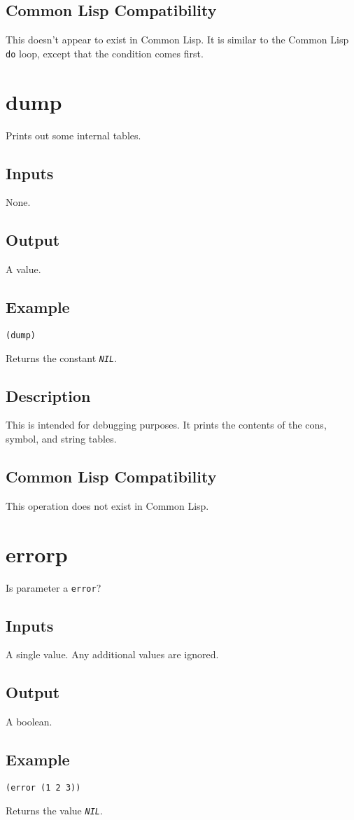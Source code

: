 \documentclass[10pt, openany]{book}
\newcommand{\constant}[1]{\emph{\texttt{#1}}}
\newcommand{\keyword}[1]{\texttt{#1}}
\newcommand{\datatype}[1]{\texttt{#1}}
\newcommand{\cl}{Common Lisp}
\begin{document}
\subsection{Common Lisp Compatibility}
This doesn't appear to exist in \cl.  It is similar to the \cl{} \keyword{do} loop, except that the condition comes first.

\section{dump}
Prints out some internal tables.
\subsection{Inputs}
None.
\subsection{Output}
A value.
\subsection{Example}
\begin{lstlisting}
(dump)
\end{lstlisting}
Returns the constant \constant{NIL}.
\subsection{Description}
This is intended for debugging purposes.  It prints the contents of the cons, symbol, and string tables.
\subsection{Common Lisp Compatibility}
This operation does not exist in \cl.

\section{errorp}
Is parameter a \datatype{error}?
\subsection{Inputs}
A single value.  Any additional values are ignored.
\subsection{Output}
A boolean.
\subsection{Example}
\begin{lstlisting}
(error (1 2 3))
\end{lstlisting}
Returns the value \constant{NIL}.
\end{document}

